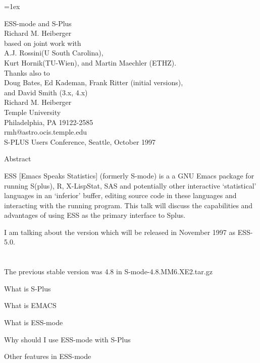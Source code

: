 \documentclass[12pt]{article}   %
\begin{document}
\Huge
\parskip=1ex


\begin{center}
\Huge
ESS-mode and S-Plus\\
Richard M. Heiberger\\[1ex]
based on joint work with\\
A.J. Rossini(U South Carolina),\\
 Kurt Hornik(TU-Wien), and Martin Maechler (ETHZ).\\[2ex]
Thanks also to\\
Doug Bates, Ed Kademan, Frank Ritter (initial versions),\\
and David Smith (3.x, 4.x)\\[3ex]

Richard M. Heiberger\\[.4ex]
Temple University\\[.4ex]
Philadelphia, PA 19122-2585\\[.4ex]
{\sf rmh@astro.ocis.temple.edu}\\[2ex]
S-PLUS Users Conference, Seattle, October 1997
\end{center}


\newpage
\begin{center}Abstract\end{center}
ESS [Emacs Speaks Statistics] (formerly S-mode) is a a GNU Emacs
package for running S(plus), R, X-LispStat, SAS and potentially other
interactive `statistical' languages in an `inferior' buffer, editing
source code in these languages and interacting with the running
program.  This talk will discuss the capabilities and advantages of
using ESS as the primary interface to Splus.


I am talking about the version which will be released in November 1997
as ESS-5.0.\\
\hspace*{2ex}{\sf http://franz.stat.wisc.edu/pub/ESS/ESS-5.0.tar.gz}\\
\hspace*{2ex}{\sf ftp://franz.stat.wisc.edu/pub/ESS/ESS-5.0.tar.gz}\\
The previous stable version was 4.8 in
{\sf S-mode-4.8.MM6.XE2.tar.gz}

\newpage

What is S-Plus

What is EMACS

What is ESS-mode

Why should I use ESS-mode with S-Plus

Other features in ESS-mode
\end{document}
